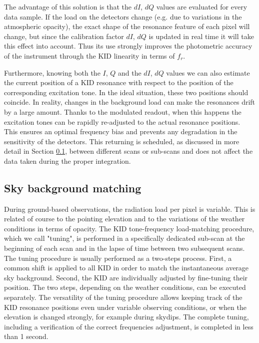\documentclass[]{aa} %
\begin{document}
The advantage of this solution is that the $dI$, $dQ$ values are evaluated for every data sample. If the load on the detectors change (e.g. due to variations in the atmospheric opacity), the exact shape of the resonance feature of each pixel will change, but since the calibration factor $dI$, $dQ$ is updated in real time it will take this effect into account. Thus its use strongly improves the photometric accuracy of the instrument through the KID linearity in terms of $f_r$.

Furthermore, knowing both the $I$, $Q$ and the $dI$, $dQ$ values we can also estimate the current position of a KID resonance with respect to the position of the corresponding excitation tone. In the ideal situation, these two positions should coincide. In reality, changes in the background load can make the resonances drift by a large amount. Thanks to the modulated readout, when this happens the excitation tones can be rapidly re-adjusted to the actual resonance positions. This ensures an optimal frequency bias and prevents any degradation in the sensitivity of the detectors. This returning is scheduled, as discussed in more detail in Section \ref{Sky background matching}, between different scans or sub-scans and does not affect the data taken during the proper integration.

\subsection{Sky background matching}
\label{Sky background matching}

During ground-based observations, the radiation load per pixel is variable. This is related of course to the pointing elevation and to the variations of the weather conditions in terms of opacity. The KID tone-frequency load-matching procedure, which we call "tuning", is performed in a specifically dedicated sub-scan at the beginning of each scan and in the lapse of time between two subsequent scans. The tuning procedure is usually performed as a two-steps process. First, a common shift is applied to all KID in order to match the instantaneous average sky background. Second, the KID are individually adjusted by fine-tuning their position. The two steps, depending on the weather conditions, can be executed separately. The versatility of the tuning procedure allows keeping track of the KID resonance positions even under variable observing conditions, or when the elevation is changed strongly, for example during skydips. The complete tuning, including a verification of the correct frequencies adjustment, is completed in less than 1 second. 
\end{document}
